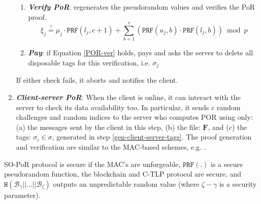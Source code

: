 \begin{enumerate}[leftmargin=.46cm]
\begin{enumerate}
\item\label{verify-PoR}\textbf{\textit{\small {Verify PoR}}}: regenerates the pseudorandom values and verifies the PoR proof.  
\begin{equation}\label{POR-ver}\xi_{\scriptscriptstyle j}\stackrel{\scriptscriptstyle ?}=\mu_{\scriptscriptstyle j}  \cdot\mathtt{PRF}(l_{\scriptscriptstyle j},c+1)+\sum\limits^{\scriptscriptstyle c}_{\scriptscriptstyle b=1} ( \mathtt{PRF}(u_{\scriptscriptstyle j},b)\cdot \mathtt{PRF}(l_{\scriptscriptstyle j},b))\bmod p
\end{equation}
\item\textbf{\textit{\small {Pay}}}: if  Equation \ref{POR-ver} holds, pays and asks the server to delete all disposable tags for this verification, i.e. $\sigma_{\scriptscriptstyle j}$
\end{enumerate}
If either check fails, it aborts and notifies the client. 

\vspace{-1mm}
\item \textit{\textbf{Client-server PoR}}: When the client is online, it can   interact  with the server  to check its data availability too. In particular, it sends $c$ random challenges and random indices to the server who computes POR using only: (a) the  messages sent by the client in this step, (b) the  file: ${\bm{F}}$, and (c) the tags:  $\sigma_{\scriptscriptstyle i}\in\sigma$, generated in step \ref{gen-client-server-tags}.  The proof generation and verification are similar to the MAC-based schemes, e.g.  \cite{DBLP:conf/asiacrypt/ShachamW08}. 
\end{enumerate}


\begin{theorem}\label{PoR-main-theorem} SO-PoR protocol is secure  if the MAC's are unforgeable, $\mathtt{PRF}(.)$ is a secure pseudorandom function, the blockchain and C-TLP protocol are secure, and $\mathtt{H}( \mathcal {B}_{\scriptscriptstyle \gamma}||...||  \mathcal {B}_{\scriptscriptstyle \zeta})$ outputs an unpredictable random value (where $\zeta-\gamma$ is a security parameter).
\end{theorem}


